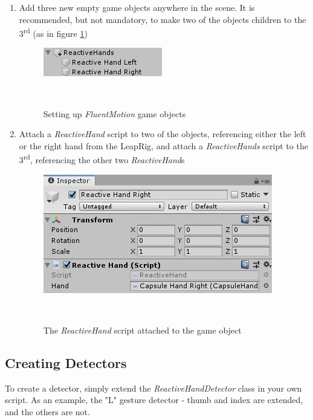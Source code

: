 \documentclass{sigchi}
\def\fluentmotion{\textit{FluentMotion}}
\begin{document}
\begin{enumerate}
  \item Add three new empty game objects anywhere in the scene. It is recommended, but not mandatory, to make two of the objects children to the 3\textsuperscript{rd} (as in figure \ref{fig:figure5})
  \begin{figure}[H]
    \centering
    \includegraphics[width=0.9\columnwidth]{figures/FluentMotion_setup}
    \caption{Setting up \fluentmotion{} game objects}~\label{fig:figure5}
  \end{figure}

  \item Attach a \textit{ReactiveHand} script to two of the objects, referencing either the left or the right hand from the LeapRig, and attach a \textit{ReactiveHands} script to the 3\textsuperscript{rd}, referencing the other two \textit{ReactiveHand}s
  \begin{figure}[h]
    \centering
    \includegraphics[width=0.9\columnwidth]{figures/FluentMotion_reactive_hand}
    \caption{The \textit{ReactiveHand} script attached to the game object}~\label{fig:figure6}
  \end{figure}
\end{enumerate}

\subsection{Creating Detectors}

To create a detector, simply extend the \textit{ReactiveHandDetector} class in your own script. As an example, the "L" gesture detector - thumb and index are extended, and the others are not.
\end{document}
